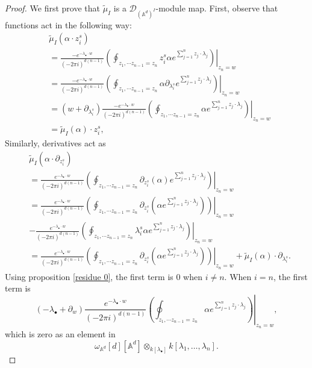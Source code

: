 \documentclass[11pt]{amsart}
\theoremstyle{definition}
\theoremstyle{remark}
\numberwithin{equation}{section}
\begin{document}
\begin{proof}
    We first prove that $\tilde{\mu}_{ I}$ is a $\mathcal{D}_{(\mathbb{A}^{d})^{ I}}$-module map. 
    First, observe that functions act in the following way:
    \begin{align*}
        &\tilde{\mu}_{ I}(\alpha\cdot z_{i}^{s})\\
        &=
        \frac{-e^{-\lambda_{\bullet}\cdot w}}{(-2\pi i)^{d(n-1)}}\left.\left(\oint_{z_{1},\cdots z_{n-1}=z_{n}}z_{i}^{s}\alpha e^{\sum_{j=1}^{n}z_{j}\cdot \lambda_{j}}\right)\right|_{z_n=w}\\
        &=
        \frac{-e^{-\lambda_{\bullet}\cdot w}}{(-2\pi i)^{d(n-1)}}\left.\left(\oint_{z_{1},\cdots z_{n-1}=z_{n}}\alpha \partial_{\lambda_{i}^{s}}e^{\sum_{j=1}^{n}z_{j}\cdot \lambda_{j}}\right)\right|_{z_n=w}\\
        &=(w+\partial_{\lambda_{i}^{s}})\frac{-e^{-\lambda_{\bullet}\cdot w}}{(-2\pi i)^{d(n-1)}}\left.\left(\oint_{z_{1},\cdots z_{n-1}=z_{n}}\alpha e^{\sum_{j=1}^{n}z_{j}\cdot \lambda_{j}}\right)\right|_{z_n=w}\\
        &=
        \tilde{\mu}_{ I}(\alpha)\cdot z_{i}^{s},
    \end{align*}
    Similarly, derivatives act as
    \begin{align*}
        &\tilde{\mu}_{ I}(\alpha\cdot \partial_{z_{i}^{s}})\\
        &=
        \frac{e^{-\lambda_{\bullet}\cdot w}}{(-2\pi i)^{d(n-1)}}\left.\left(\oint_{z_{1},\cdots z_{n-1}=z_{n}}\partial_{z_{i}^{s}}(\alpha) e^{\sum_{j=1}^{n}z_{j}\cdot \lambda_{j}}\right)\right|_{z_n=w}\\
        &=
        \frac{e^{-\lambda_{\bullet}\cdot w}}{(-2\pi i)^{d(n-1)}}\left.\left(\oint_{z_{1},\cdots z_{n-1}=z_{n}}\partial_{z_{i}^{s}}(\alpha e^{\sum_{j=1}^{n}z_{j}\cdot \lambda_{j}})\right)\right|_{z_n=w}\\
        &-
        \frac{e^{-\lambda_{\bullet}\cdot w}}{(-2\pi i)^{d(n-1)}}\left.\left(\oint_{z_{1},\cdots z_{n-1}=z_{n}}\lambda_{i}^{s}\alpha e^{\sum_{j=1}^{n}z_{j}\cdot \lambda_{j}}\right)\right|_{z_n=w}\\
        &=
        \frac{e^{-\lambda_{\bullet}\cdot w}}{(-2\pi i)^{d(n-1)}}\left.\left(\oint_{z_{1},\cdots z_{n-1}=z_{n}}\partial_{z_{i}^{s}}(\alpha e^{\sum_{j=1}^{n}z_{j}\cdot \lambda_{j}})\right)\right|_{z_n=w}+
        \tilde{\mu}_{ I}(\alpha)\cdot \partial_{\lambda_{i}^{s}}.
    \end{align*}
    Using proposition \ref{residue 0}, the first term is $0$ when $i\neq n$. When $i=n$, the first term is
    $$
    (-\lambda_{\bullet}+\partial_{w})\frac{e^{-\lambda_{\bullet}\cdot w}}{(-2\pi i)^{d(n-1)}}\left.\left(\oint_{z_{1},\cdots z_{n-1}=z_{n}}\alpha e^{\sum_{j=1}^{n}z_{j}\cdot \lambda_{j}}\right)\right|_{z_n=w},
    $$
    which is zero as an element in
    $$
    \omega_{\mathbb{A}^{d}}[d][\mathbb{A}^{d}]\otimes_{k[\lambda_{\bullet}]}k[\lambda_{1},\dots,\lambda_{n}].
    $$


\end{proof}
\end{document}
